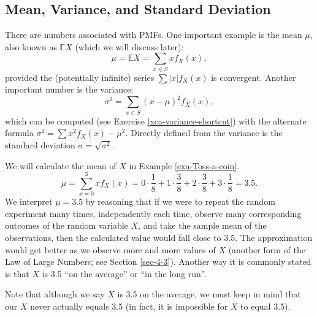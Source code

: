 \documentclass[captions=tableheading]{scrbook}
\begin{document}
\subsection{Mean, Variance, and Standard Deviation}
\label{sec-5-1-2}
\label{sub-mean-variance-sd}


There are numbers associated with PMFs. One important example is the mean \(\mu\), also known as \(\mathbb{E} X\) (which we will discuss later):
\begin{equation}
\mu=\mathbb{E} X=\sum_{x\in S}xf_{X}(x),
\end{equation}
provided the (potentially infinite) series \(\sum|x|f_{X}(x)\) is convergent. Another important number is the variance:
\begin{equation}
\sigma^{2}=\sum_{x\in S}(x-\mu)^{2}f_{X}(x),
\end{equation}
which can be computed (see Exercise \ref{xca-variance-shortcut}) with the alternate formula \(\sigma^{2}=\sum x{}^{2}f_{X}(x)-\mu^{2}\). Directly defined from the variance is the standard deviation \(\sigma=\sqrt{\sigma^{2}}\).
 
\begin{example}
We will calculate the mean of \(X\) in Example \ref{exa-Toss-a-coin}.
\[
\mu=\sum_{x=0}^{3}xf_{X}(x)=0\cdot\frac{1}{8}+1\cdot\frac{3}{8}+2\cdot\frac{3}{8}+3\cdot\frac{1}{8}=3.5.
\]
We interpret \(\mu = 3.5\) by reasoning that if we were to repeat the random experiment many times, independently each time, observe many corresponding outcomes of the random variable \(X\), and take the sample mean of the observations, then the calculated value would fall close to 3.5. The approximation would get better as we observe more and more values of \(X\) (another form of the Law of Large Numbers; see Section \ref{sec-4-3}). Another way it is commonly stated is that \(X\) is 3.5 ``on the average'' or ``in the long run''.
\end{example}

\begin{rem}
Note that although we say \(X\) is 3.5 on the average, we must keep in mind that our \(X\) never actually equals 3.5 (in fact, it is impossible for \(X\) to equal 3.5).
\end{rem}
\end{document}
